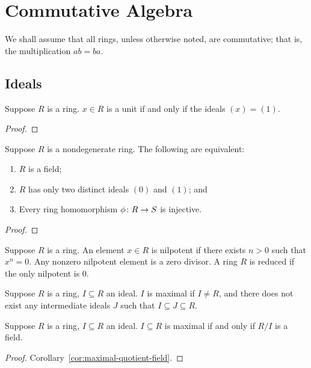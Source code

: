 \chapter{Commutative Algebra}\label{ch:comm-alg}

\begin{remark}
    We shall assume that all rings,
    unless otherwise noted, are commutative;
    that is, the multiplication \(ab = ba\).
\end{remark}

\section{Ideals}

\begin{proposition}
    Suppose \(R\) is a ring.
    \(x \in R\) is a unit if and only if the ideals \((x) = (1)\).
\end{proposition}
\begin{proof}
    
\end{proof}

\begin{theorem}
    Suppose \(R\) is a nondegenerate ring.
    The following are equivalent:
    \begin{enumerate}[label={(\alph*)}, itemsep=0mm]
        \item \(R\) is a field;
        \item \(R\) has only two distinct ideals \((0)\) and \((1)\); and
        \item Every ring homomorphism \(\phi\colon R\to S\) is injective.
    \end{enumerate}
\end{theorem}
\begin{proof}
    
\end{proof}

\begin{definition}
    Suppose \(R\) is a ring.
    An element \(x \in R\) is nilpotent if there exists \(n > 0\) such that \(x^n = 0\).
    Any nonzero nilpotent element is a zero divisor.
    A ring \(R\) is reduced if the only nilpotent is 0.
\end{definition}

\begin{definition}
    Suppose \(R\) is a ring, \(I \subseteq R\) an ideal.
    \(I\) is maximal if \(I \neq R\),
    and there does not exist any intermediate ideals \(J\)
    such that \(I \subseteq J \subseteq R\).
\end{definition}
\begin{theorem}\label{thm:maximal-quotient-field}
    Suppose \(R\) is a ring, \(I \subseteq R\) an ideal.
    \(I \subseteq R\) is maximal if and only if \(R/I\) is a field.
\end{theorem}
\begin{proof}
    Corollary~\ref{cor:maximal-quotient-field}.
\end{proof}

